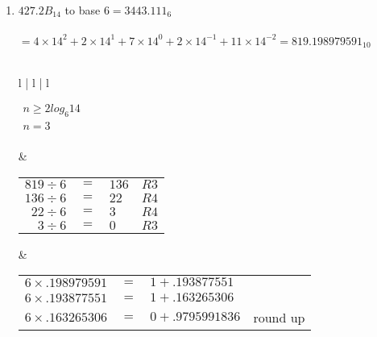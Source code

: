 \documentclass[12pt]{article}
\begin{document}
\begin{enumerate}
\begin{tabular}{l | l | l}
        &

        \begin{tabular}{r c l l}
            $5 \times .140625$ & $=$ & $0 + .703125$ & \\
            $5 \times .703125$ & $=$ & $3 + .515625$ & \\
            $5 \times .515625$ & $=$ & $2 + .578125$ & \\
            $5 \times .578125$ & $=$ & $2 + .890625$ & round up \\
        \end{tabular}
        
     \end{tabular}

     \pagebreak

     \item $427.2B_{14}$ to base $6 = \boxed{3443.111_{6}}$ \\ \\
     $ = 4 \times 14^2 + 2 \times 14^1 + 7 \times 14^0 + 2 \times 14^{-1} + 11 \times 14^{-2} = 819.198979591_{10}$ \\\\
     
        \begin{tabular}{l | l | l} 

        $\begin{aligned}
            n \geq 2log_{6}14 \\
            n = 3 \\
        \end{aligned}$

        &

        \begin{tabular}{r c l l}
            $819 \div 6$  & $=$ & $136$ & $R3$ \\
            $136 \div 6$  & $=$ & $22$ & $R4$  \\
            $22 \div 6$   & $=$ & $3$  & $R4$  \\
            $3 \div 6$    & $=$ & $0$  & $R3$  \\
        \end{tabular}

        &

        \begin{tabular}{r c l l}
            $6 \times .198979591$ & $=$ & $1 + .193877551$  & \\
            $6 \times .193877551$ & $=$ & $1 + .163265306$  & \\
            $6 \times .163265306$ & $=$ & $0 + .9795991836$ & round up \\
        \end{tabular}
        

\end{tabular}
\end{enumerate}
\end{document}
